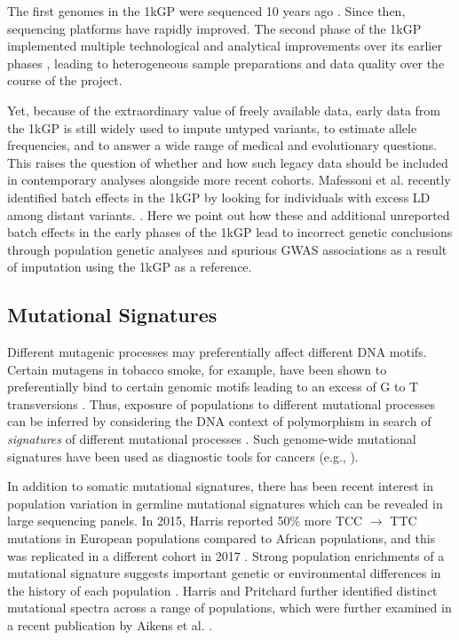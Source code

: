 \documentclass[9pt,article]{template}
\begin{document}
The first genomes in the 1kGP were sequenced 10 years ago \citep{VanDijk2014}. Since then, sequencing platforms have rapidly improved.  
The second phase of the 1kGP implemented multiple technological and analytical improvements over its earlier phases \citep{The1000GenomesProjectConsortium2012,phase3}, leading to heterogeneous sample preparations and data quality over the course of the project.

Yet, because of the extraordinary value of freely available data, early data from the 1kGP is still widely used to impute untyped variants, to estimate allele frequencies, and to answer a wide range of medical and evolutionary questions.
This raises the question of whether and how such legacy data should be included in contemporary analyses alongside more recent cohorts.
Mafessoni et al. recently identified batch effects in the 1kGP by looking for individuals with excess LD among distant variants. \citep{mafessoni2018turning}.
Here we point out how these and additional unreported batch effects in the early phases of the 1kGP lead to incorrect genetic conclusions through population genetic analyses and spurious GWAS associations as a result of imputation using the 1kGP as a reference.

\subsection{Mutational Signatures}

Different mutagenic processes may preferentially affect different DNA motifs. 
Certain mutagens in tobacco smoke, for example, have been shown to preferentially bind to certain genomic motifs leading to an excess of G to T transversions \citep{Pfeifer2002,Pleasance2010}. 
Thus, exposure of populations to different mutational processes can be inferred by considering the DNA context of polymorphism in search of \textit{signatures} of different mutational processes \citep{Alexandrov2013,Shiraishi2015a}. 
Such genome-wide mutational signatures have been used as diagnostic tools for cancers (e.g., \cite{Alexandrov2013,Shiraishi2015a}).

In addition to somatic mutational signatures, there has been recent interest in population variation in germline mutational signatures which can be revealed in large sequencing panels. 
In 2015, Harris reported 50\% more TCC ${\rightarrow}$ TTC mutations in European populations compared to African populations, and this was replicated in a different cohort in 2017 \citep{Harris2015a, Harris2017a, Mathieson2017a}. 
Strong population enrichments of a mutational signature suggests important genetic or environmental differences in the history of each population \citep{Harris2015a, Harris2017a}. 
Harris and Pritchard further identified distinct mutational spectra across a range of populations, which were further examined in a recent publication by Aikens et al. \citep{Harris2017a,Aikens2018}.
 
\end{document}
